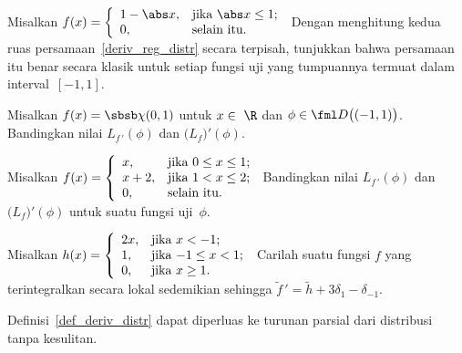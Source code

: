 \begin{exer} Misalkan $f(x) = \left\{
                           \begin{array}{ll}
                             1 - \abs x, & \hbox{jika $\abs x \le 1$;} \\
                                 0,      & \hbox{selain itu.}
                           \end{array}
                         \right.$ Dengan menghitung kedua ruas persamaan~\eqref{deriv_reg_distr} secara terpisah, tunjukkan bahwa persamaan itu
benar secara klasik untuk setiap fungsi uji yang tumpuannya termuat dalam interval~$[-1,1]$.
\end{exer}

\begin{exer} Misalkan $f(x) = \sbsb\chi{(0,1)}$ untuk $x \in~\R$ dan $\phi \in \fml D\bigl((-1,1)\bigr)$. Bandingkan nilai $L_{f\,'}(\phi)$ dan
$\bigl(L_f\bigr)'(\phi)$.
\end{exer}

\begin{exer} Misalkan $f(x) = \left\{
                           \begin{array}{ll}
                             x, & \hbox{jika $0 \le x \le 1$;} \\
                             x + 2, & \hbox{jika $1 < x \le 2$;} \\
                             0, & \hbox{selain itu.}
                           \end{array}
                         \right.$ Bandingkan nilai $L_{f\,'}(\phi)$ dan $\bigl(L_f\bigr)'(\phi)$ untuk suatu fungsi uji~$\phi$.
\end{exer}

\begin{exer} Misalkan $h(x) = \left\{
                           \begin{array}{ll}
                             2x, & \hbox{jika $x < -1$;} \\
                             1, & \hbox{jika $-1 \le x < 1$;} \\
                             0, & \hbox{jika $x \ge 1$.}
                           \end{array}
                         \right.$ Carilah suatu fungsi $f$ yang terintegralkan secara lokal sedemikian sehingga ${\tilde f}\,' = \tilde h + 3\delta_1 - \delta_{-1}$.
\end{exer}

Definisi~\ref{def_deriv_distr} dapat diperluas ke turunan parsial dari distribusi tanpa kesulitan.

